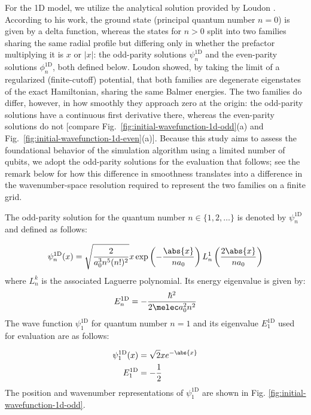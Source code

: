 \documentclass[manuscript_main.tex]{subfiles}
\begin{document}
For the 1D model, we utilize the analytical solution provided by Loudon
\cite{Loudon1959.10.1119/1.1934950}. According to his work, the ground state
(principal quantum number $n=0$) is given by a delta function, whereas the
states for $n>0$ split into two families sharing the same radial profile but
differing only in whether the prefactor multiplying it is $x$ or $|x|$: the
odd-parity solutions $\psi_n^{\mathrm{1D}}$ and the even-parity solutions
$\phi_n^{\mathrm{1D}}$, both defined below. Loudon showed, by taking the
limit of a regularized (finite-cutoff) potential, that both families are
degenerate eigenstates of the exact Hamiltonian, sharing
the same Balmer energies. The two families do differ, however, in how
smoothly they approach zero at the origin: the odd-parity solutions have a
continuous first derivative there, whereas the even-parity solutions do not
[compare Fig.~\ref{fig:initial-wavefunction-1d-odd}(a) and
Fig.~\ref{fig:initial-wavefunction-1d-even}(a)]. Because this study aims to
assess the foundational behavior of the simulation algorithm using a
limited number of qubits, we adopt the odd-parity solutions for the
evaluation that follows; see the remark below for how this difference in
smoothness translates into a difference in the wavenumber-space resolution
required to represent the two families on a finite grid.

The odd-parity solution for the quantum number $n \in \{1, 2, \dots\}$ is
denoted by $\psi_n^{\mathrm{1D}}$ and defined as follows:

\begin{equation}
\psi_n^{\mathrm{1D}}(x)=\sqrt{\frac{2}{a_0^3n^5(n!)^2}}
x\exp\left(-\frac{\abs{x}}{na_0}\right)L_n^1\left(\frac{2\abs{x}}{na_0}\right)
\end{equation}
where $L_n^k$ is the associated Laguerre polynomial. Its energy eigenvalue is given by:
\begin{equation}
    E_n^{\mathrm{1D}}=-\frac{\hbar^2}{2\melec a_0^2 n^2}
\end{equation}
The wave function $\psi_1^{\mathrm{1D}}$ for quantum number $n=1$ and its
eigenvalue $E_1^{\mathrm{1D}}$ used for evaluation are as follows:

\begin{align}
\psi_1^{\mathrm{1D}}(x)&=\sqrt{2} x e^{-\abs{x}}
\label{eq:psi1D1-wave-function}\\
E_1^{\mathrm{1D}}&=-\frac{1}{2}
\label{eq:psi1D1-energy}
\end{align}
The position and wavenumber representations of $\psi_1^{\mathrm{1D}}$ are shown
in Fig. \ref{fig:initial-wavefunction-1d-odd}.
\end{document}
